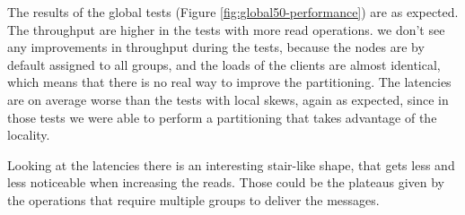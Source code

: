 

\newpage
The results of the global tests (Figure \ref{fig:global50-performance}) are as expected. The throughput are higher in the tests with more read operations. we don't see any improvements in throughput during the tests, because the nodes are by default assigned to all groups, and the loads of the clients are almost identical, which means that there is no real way to improve the partitioning. The latencies are on average worse than the tests with local skews, again as expected, since in those tests we were able to perform a partitioning that takes advantage of the locality.

Looking at the latencies there is an interesting stair-like shape, that gets less and less noticeable when increasing the reads. Those could be the plateaus given by the operations that require multiple groups to deliver the messages.

